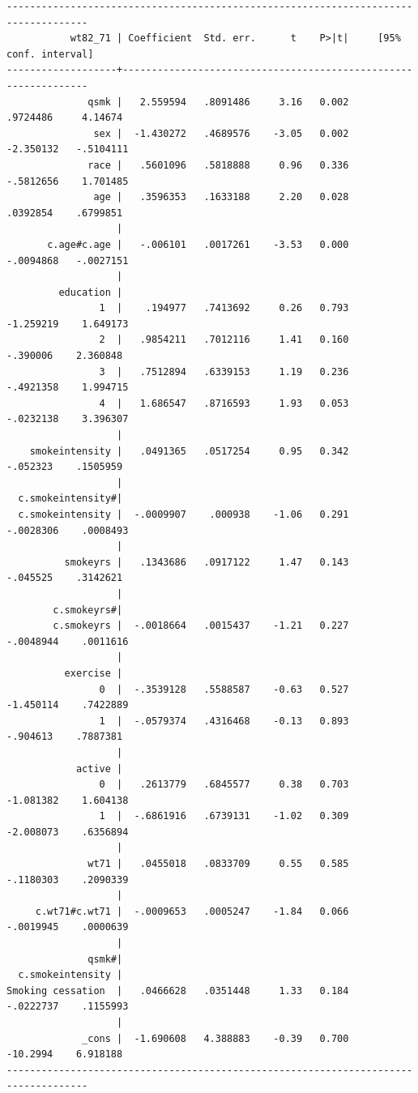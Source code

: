 \documentclass[
  10pt,
  a4paper,
]{book}
\begin{document}
\begin{verbatim}
------------------------------------------------------------------------------------
           wt82_71 | Coefficient  Std. err.      t    P>|t|     [95% conf. interval]
-------------------+----------------------------------------------------------------
              qsmk |   2.559594   .8091486     3.16   0.002     .9724486     4.14674
               sex |  -1.430272   .4689576    -3.05   0.002    -2.350132   -.5104111
              race |   .5601096   .5818888     0.96   0.336    -.5812656    1.701485
               age |   .3596353   .1633188     2.20   0.028     .0392854    .6799851
                   |
       c.age#c.age |   -.006101   .0017261    -3.53   0.000    -.0094868   -.0027151
                   |
         education |
                1  |    .194977   .7413692     0.26   0.793    -1.259219    1.649173
                2  |   .9854211   .7012116     1.41   0.160     -.390006    2.360848
                3  |   .7512894   .6339153     1.19   0.236    -.4921358    1.994715
                4  |   1.686547   .8716593     1.93   0.053    -.0232138    3.396307
                   |
    smokeintensity |   .0491365   .0517254     0.95   0.342     -.052323    .1505959
                   |
  c.smokeintensity#|
  c.smokeintensity |  -.0009907    .000938    -1.06   0.291    -.0028306    .0008493
                   |
          smokeyrs |   .1343686   .0917122     1.47   0.143     -.045525    .3142621
                   |
        c.smokeyrs#|
        c.smokeyrs |  -.0018664   .0015437    -1.21   0.227    -.0048944    .0011616
                   |
          exercise |
                0  |  -.3539128   .5588587    -0.63   0.527    -1.450114    .7422889
                1  |  -.0579374   .4316468    -0.13   0.893     -.904613    .7887381
                   |
            active |
                0  |   .2613779   .6845577     0.38   0.703    -1.081382    1.604138
                1  |  -.6861916   .6739131    -1.02   0.309    -2.008073    .6356894
                   |
              wt71 |   .0455018   .0833709     0.55   0.585    -.1180303    .2090339
                   |
     c.wt71#c.wt71 |  -.0009653   .0005247    -1.84   0.066    -.0019945    .0000639
                   |
              qsmk#|
  c.smokeintensity |
Smoking cessation  |   .0466628   .0351448     1.33   0.184    -.0222737    .1155993
                   |
             _cons |  -1.690608   4.388883    -0.39   0.700     -10.2994    6.918188
------------------------------------------------------------------------------------




\end{verbatim}
\end{document}
